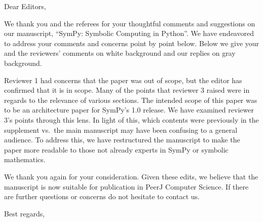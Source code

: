 \documentclass{letter}
\date{September 31, 2016} %
\begin{document}
\begin{letter}{}
\opening{Dear Editors,}

We thank you and the referees for your thoughtful comments and suggestions on
our manuscript, ``SymPy: Symbolic Computing in Python''. We have endeavored to
address your comments and concerns point by point below. Below we give your
and the reviewers' comments on white background and our replies on gray
background.

Reviewer 1 had concerns that the paper was out of scope, but the editor has
confirmed that it is in scope. Many of the points that reviewer 3 raised were
in regards to the relevance of various sections. The intended scope of this
paper was to be an architecture paper for SymPy's 1.0 release. We have
examined reviewer 3's points through this lens. In light of this, which
contents were previously in the supplement vs.\ the main manuscript may have
been confusing to a general audience. To address this, we have restructured
the manuscript to make the paper more readable to those not already experts in
SymPy or symbolic mathematics.

We thank you again for your consideration. Given these edits, we believe that
the manuscript is now suitable for publication in PeerJ Computer Science. If
there are further questions or concerns do not hesitate to contact us.

\closing{Best regards,}

\end{letter}
\end{document}
